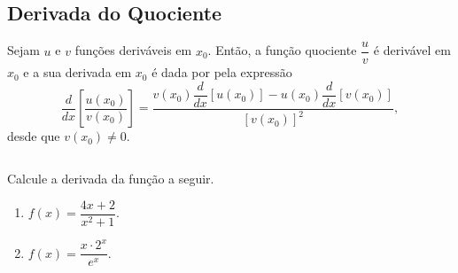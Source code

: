 \subsection{Derivada do Quociente}
\begin{frame}
  \begin{theorem}
    Sejam $u$ e $v$ funções deriváveis em $x_{0}$. Então, a função quociente $\dfrac{u}{v}$ é derivável em $x_{0}$ e a sua derivada em $x_{0}$ é dada por pela expressão
    \begin{equation*}
      \frac{d}{dx}\left[\frac{u(x_{0})}{v(x_{0})}\right]=\frac{v(x_{0})\dfrac{d}{dx}\left[u(x_{0})\right] - u(x_{0})\dfrac{d}{dx}\left[v(x_{0})\right]}{\left[v(x_{0})\right]^{2}},
    \end{equation*}
    desde que $v(x_{0}) \not= 0$.
  \end{theorem}
  \begin{columns}[onlytextwidth]
    \begin{column}{0.5\textwidth}
      \begin{example-highlight}
        Calcule a derivada da função a seguir.
        \begin{enumerate}
          \item $f(x)=\dfrac{4x+2}{x^2+1}$.
          \item $f(x)=\dfrac{x\cdot 2^{x}}{e^{x}}$.
        \end{enumerate}
      \end{example-highlight}
    \end{column}
    \begin{column}{0.5\textwidth}
    \end{column}
  \end{columns}
\end{frame}

